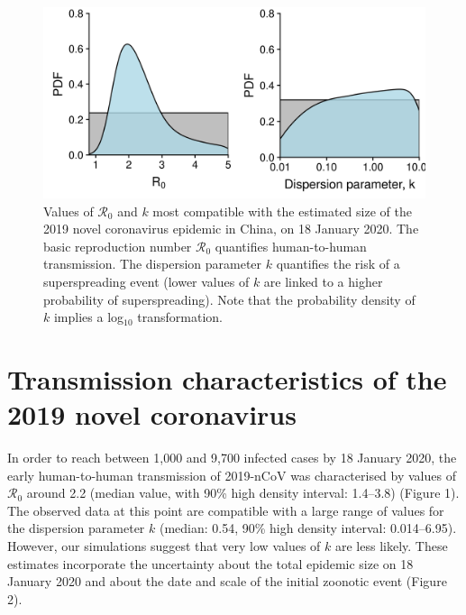 \documentclass{article}
\begin{document}
\begin{figure}[b]
	\centering
	\includegraphics[width=.6\linewidth]{../figure/fig_post.png}
	\caption{Values of $\mathcal{R}_0$ and $k$ most compatible with the estimated size of the 2019 novel coronavirus epidemic in China, on 18 January 2020. The basic reproduction number $\mathcal{R}_0$ quantifies human-to-human transmission. The dispersion parameter $k$ quantifies the risk of a superspreading event (lower values of $k$ are linked to a higher probability of superspreading). Note that the probability density of $k$ implies a log$_{10}$ transformation.}
	\label{fig:fig_post}
\end{figure}

\section*{Transmission characteristics of the 2019 novel coronavirus}

In order to reach between 1,000 and 9,700 infected cases by 18 January 2020, the early human-to-human transmission of 2019-nCoV was characterised by values of $\mathcal{R}_0$ around 2.2 (median value, with 90\% high density interval: 1.4–3.8) (Figure 1). The observed data at this point are compatible with a large range of values for the dispersion parameter $k$ (median: 0.54, 90\% high density interval: 0.014–6.95). However, our simulations suggest that very low values of $k$ are less likely. These estimates incorporate the uncertainty about the total epidemic size on 18 January 2020 and about the date and scale of the initial zoonotic event (Figure 2).
\end{document}
